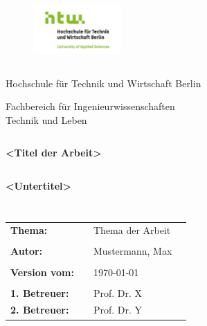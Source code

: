 \thispagestyle{empty}


\begin{figure}[t]
 \centering
 \includegraphics[width=0.3\textwidth]{abb/htw_logo.png}
\end{figure}

\begin{verbatim}

\end{verbatim}

\begin{center}
\Large{Hochschule für Technik und Wirtschaft Berlin}\\
\end{center}

\begin{center}
\Large{Fachbereich für Ingenieurwissenschaften\\ Technik und Leben}
\end{center}
\begin{verbatim}

\end{verbatim}
\begin{center}
\doublespacing
\textbf{\LARGE{<Titel der Arbeit>}}\\
\singlespacing
\begin{verbatim}

\end{verbatim}
\textbf{<Untertitel>}
\end{center}
\begin{verbatim}

\end{verbatim}
\begin{center}

\end{center}
\begin{verbatim}

\end{verbatim}
\begin{flushleft}
\begin{tabular}{llll}
\textbf{Thema:} & &Thema der Arbeit& \\
& & \\
\textbf{Autor:} & & Mustermann, Max & \\
& & \\
\textbf{Version vom:} & & \today &\\
& & \\
\textbf{1. Betreuer:} & & Prof. Dr. X &\\
\textbf{2. Betreuer:} & & Prof. Dr. Y &\\
\end{tabular}
\end{flushleft}
